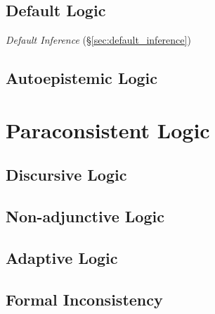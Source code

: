 \subsection{Default Logic}\label{sec:default_logic}

\emph{Default Inference} (\S\ref{sec:default_inference})



\subsection{Autoepistemic Logic}\label{sec:autoepistemic_logic}



\section{Paraconsistent Logic}\label{sec:paraconsistent_logic}

\subsection{Discursive Logic}\label{sec:discursive_logic}

\subsection{Non-adjunctive Logic}\label{sec:nonadjunctive_logic}

\subsection{Adaptive Logic}\label{sec:adaptive_logic}

\subsection{Formal Inconsistency}\label{sec:formal_inconsistency}

